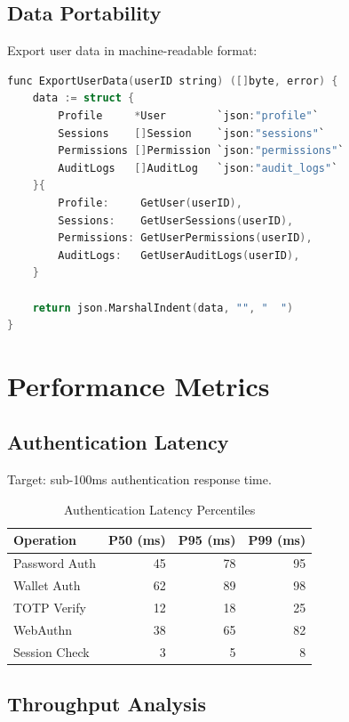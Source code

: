 \documentclass[11pt,a4paper]{article}
\begin{document}
\subsection{Data Portability}

Export user data in machine-readable format:

\begin{lstlisting}[language=C]
func ExportUserData(userID string) ([]byte, error) {
    data := struct {
        Profile     *User        `json:"profile"`
        Sessions    []Session    `json:"sessions"`
        Permissions []Permission `json:"permissions"`
        AuditLogs   []AuditLog   `json:"audit_logs"`
    }{
        Profile:     GetUser(userID),
        Sessions:    GetUserSessions(userID),
        Permissions: GetUserPermissions(userID),
        AuditLogs:   GetUserAuditLogs(userID),
    }

    return json.MarshalIndent(data, "", "  ")
}
\end{lstlisting}

\section{Performance Metrics}

\subsection{Authentication Latency}

Target: sub-100ms authentication response time.

\begin{table}[h]
\centering
\begin{tabular}{|l|r|r|r|}
\hline
\textbf{Operation} & \textbf{P50 (ms)} & \textbf{P95 (ms)} & \textbf{P99 (ms)} \\
\hline
Password Auth & 45 & 78 & 95 \\
Wallet Auth & 62 & 89 & 98 \\
TOTP Verify & 12 & 18 & 25 \\
WebAuthn & 38 & 65 & 82 \\
Session Check & 3 & 5 & 8 \\
\hline
\end{tabular}
\caption{Authentication Latency Percentiles}
\end{table}

\subsection{Throughput Analysis}
\end{document}
